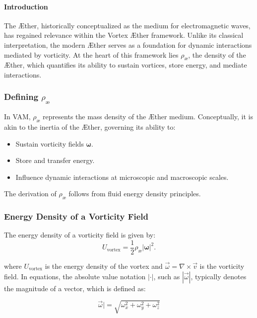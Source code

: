 \paragraph*{Introduction} The Æther, historically conceptualized as the medium for electromagnetic waves, has regained relevance within the Vortex Æther framework. Unlike its classical interpretation, the modern Æther serves as a foundation for dynamic interactions mediated by vorticity. At the heart of this framework lies $\rho_\text{\ae}$, the density of the Æther, which quantifies its ability to sustain vortices, store energy, and mediate interactions.

\subsubsection*{Defining $ \rho_{\text{\ae}} $}
In VAM, $ \rho_{\text{\ae}} $ represents the mass density of the Æther medium. Conceptually, it is akin to the inertia of the Æther, governing its ability to:

\begin{itemize}
    \item Sustain vorticity fields $ \mathbf{\omega} $.
    \item Store and transfer energy.
    \item Influence dynamic interactions at microscopic and macroscopic scales.
\end{itemize}
The derivation of $ \rho_{\text{\ae}} $ follows from fluid energy density principles.

\subsubsection*{Energy Density of a Vorticity Field}
The energy density of a vorticity field is given by:
\begin{equation}
    U_{\text{vortex}} = \frac{1}{2} \rho_{\text{\ae}} |\mathbf{\omega}|^2.
\end{equation}


where $U_{\text{vortex}}$ is the energy density of the vortex and $\vec{\omega} = \nabla \times \vec{v}$ is the vorticity field. In equations, the absolute value notation $| \cdot |$, such as $|\vec{\omega}|$, typically denotes the magnitude of a vector, which is defined as:

\begin{equation}
    \vec{\omega}| = \sqrt{\omega_x^2 + \omega_y^2 + \omega_z^2}
\end{equation}

